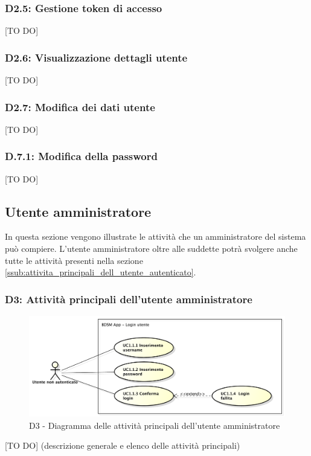 		\subsubsection{D2.5: Gestione token di accesso} %
		\label{ssub:gestione_token_di_accesso}
		[TO DO]

		\subsubsection{D2.6: Visualizzazione dettagli utente} %
		\label{ssub:visualizzazione_dettagli_utente}
		[TO DO]

		\subsubsection{D2.7: Modifica dei dati utente} %
		\label{ssub:modifica_dei_dati_utente}
		[TO DO]

		\subsubsection{D.7.1: Modifica della password} %
		\label{ssub:modifica_della_password}
		[TO DO]


	\pagebreak



	\subsection{Utente amministratore} %
	\label{sub:utente_amministratore}
	In questa sezione vengono illustrate le attività che un amministratore del sistema può compiere. L'utente amministratore oltre alle suddette potrà svolgere anche tutte le attività presenti nella sezione \ref{ssub:attivita_principali_dell_utente_autenticato}.
		\subsubsection{D3: Attività principali dell'utente amministratore} %
		\label{ssub:attivita_principali_dell_utente_amministratore}
		\begin{figure}[!htbp]
			\centering
			\centerline{\includegraphics[scale=0.45]{./images/UC1_1.pdf}}
			\caption{D3 - Diagramma delle attività principali dell'utente amministratore}
		\end{figure}
		[TO DO] (descrizione generale e elenco delle attività principali)

